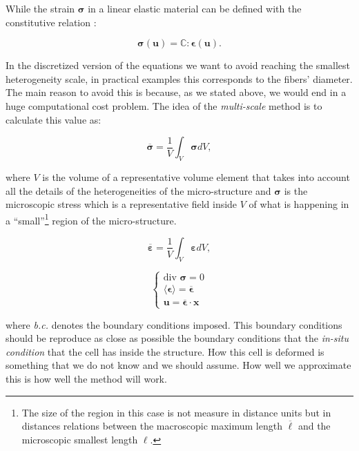 \documentclass[3p]{elsarticle}
\begin{document}
While the strain $\bm{\sigma}$ in a linear elastic material can be defined with the 
constitutive relation :

\begin{equation}
\bm{\sigma}(\bm{u}) = \mathbb{C} : \bm{\epsilon}(\bm{u}).
\label{eq:constitutive}
\end{equation}

In the discretized version of the equations we want to avoid reaching 
the smallest heterogeneity scale, in practical examples this corresponds 
to the fibers' diameter. The main reason to avoid this is because, as we 
stated above, we would end in a huge computational cost problem.
The idea of the \emph{multi-scale} method is to calculate this value
as:

\begin{equation}
\overline{\bm{\sigma}} = \frac{1}{V} \int_{V} \bm{\sigma} dV,
\label{stress_ave}
\end{equation}

\noindent
where $V$ is the volume of a
representative volume element that takes into account all the details of the
heterogeneities of the micro-structure and $\bm{\sigma}$ is the microscopic
stress which is a representative field inside $V$ of what is happening in a
``small''\footnote{The size of the region in this case is not measure in
distance units but in distances relations between the macroscopic maximum length
$\overline{\ell}$ and the microscopic smallest length $\ell$.} region of the micro-structure.

\begin{equation}
\overline{\bm{\varepsilon}} = \frac{1}{V} \int_{V} \bm{\varepsilon} dV,
\label{strain_ave}
\end{equation}

\begin{equation}
\left\{
\begin{array}{ll}
\text{div } \bm{\sigma} = 0 \\
\langle \bm{\epsilon} \rangle =  \overline{\bm{\epsilon}} \\
\bm{u} = \overline{\bm{\epsilon}} \cdot \bm{x}
\end{array}
\right.
\label{micro_eqs}
\end{equation}

\noindent
where \emph{b.c.} denotes the boundary conditions imposed. This boundary
conditions should be reproduce as close as possible the boundary conditions that
the  \emph{in-situ condition} that the cell has inside the structure. How this
cell is deformed is something that we do not know and we should assume. How well
we approximate this is how well the method will work.
\end{document}
